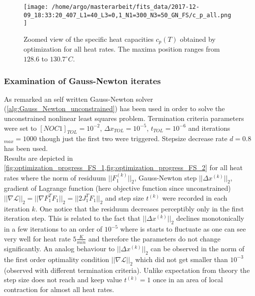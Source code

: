 \documentclass{scrartcl}[12pt, halfparskip]
\numberwithin{equation}{section}
\numberwithin{figure}{section}
\numberwithin{table}{section}
\begin{document}
\begin{figure}[H]
	\centering
	\texttt{[image: /home/argo/masterarbeit/fits\_data/2017-12-09\_18:33:20\_407\_L1=40\_L3=0,1\_N1=300\_N3=50\_GN\_FS/c\_p\_all.png]}
	\caption{Zoomed view of the specific heat capacities $c_p(T)$ obtained by optimization for all heat rates. The maxima position ranges from $128.6$ to $130.7^{\circ}C$.}
	\label{fig:FS_all_c_p}
\end{figure}

\subsubsection{Examination of Gauss-Newton iterates}

As remarked an self written Gauss-Newton solver (\cref{alg:Gauss_Newton_unconstrained}) has been used in order to solve the unconstrained nonlinear least squares problem. Termination criteria parameters were set to $[NOC1]_{TOL}=10^{-2}$, $\Delta x_{TOL}=10^{-5}$, $t_{TOL}=10^{-6}$ and iterations$_{max}=1000$ though just the first two were triggered. Stepsize decrease rate $d=0.8$ has been used. \\
Results are depicted in \cref{fig:optimization_progress_FS_1,fig:optimization_progress_FS_2} for all heat rates where the norm of residuum $||F_1^{(k)}||_2$, Gauss-Newton step $||\Delta x^{(k)}||_2$, gradient of Lagrange function (here objective function since unconstrained) $|| \nabla \mathcal{L} ||_2 = || \nabla F_1^T F_1 ||_2 = || 2 J_1^T F_1 ||_2$ and step size $t^{(k)}$ were recorded in each iteration $k$. One notice that the residuum decreases perceptibly only in the first iteration step. This is related to the fact that $||\Delta x^{(k)}||_2$ declines monotonically in a few iterations to an order of $10^{-5}$ where is starts to fluctuate as one can see very well for heat rate $5 \frac{K}{min}$ and therefore the parameters do not change significantly. An analog behaviour to $||\Delta x^{(k)}||_2$ can be observed in the norm of the first order optimality condition  $|| \nabla \mathcal{L} ||_2$ which did not get smaller than $10^{-3}$ (observed with different termination criteria).
Unlike expectation from theory the step size does not reach and keep value $t^{(k)}=1$ once in an area of local contraction for almost all heat rates. 
\end{document}
